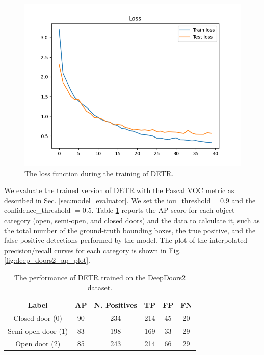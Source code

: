 \begin{figure}[h!]
	\centering
	\includegraphics[width=\linewidth]{images/deep_doors_2_loss.png}
	\caption{The loss function during the training of DETR.}
	\label{fig:deep_doors2_loss}
\end{figure}

We evaluate the trained version of DETR with the Pascal VOC metric \cite{pascal} as described in Sec. \ref{sec:model_evaluator}. We set the \textsf{iou\_threshold}$ = 0.9$ and the \textsf{confidence\_threshold} $= 0.5$. Table \ref{tab:deep_doors2_results} reports the AP score for each object category (open, semi-open, and closed doors) and the data to calculate it, such as the total number of the ground-truth bounding boxes, the true positive, and the false positive detections performed by the model. The plot of the interpolated precision/recall curves for each category is shown in Fig. \ref{fig:deep_doors2_ap_plot}.

\begin{table}[h!]
	\centering
	\begin{tabular}{cccccc}
		
		\toprule
		\textbf{Label} & \textbf{AP} & \textbf{N. Positives} & \textbf{TP} & \textbf{FP} & \textbf{FN}\tabularnewline
		\midrule
		Closed door (0) & 90 & 234 & 214 & 45 & 20 \tabularnewline
		Semi-open door (1) & 83 & 198 & 169 & 33 & 29 \tabularnewline
		Open door (2) & 85 & 243 & 214 & 66 & 29 \tabularnewline
		\bottomrule
	\end{tabular}
	\caption{The performance of DETR trained on the DeepDoors2 dataset.}
	\label{tab:deep_doors2_results}
\end{table}

